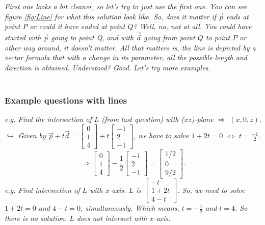 \documentclass[addpoints]{exam}
\begin{document}
\textit{First one looks a bit cleaner, so let's try to just use the first one. You can see figure \ref{fig:Line} for what this solution look like. So, does it matter if $\vec{p}$ ends at point $P$ or could it have ended at point $Q$? Well, no, not at all. You could have started with $\vec{p}$ going to point Q, and with $\vec{d}$ going from point $Q$ to point $P$ or other way around, it doesn't matter. All that matters is, the line is depicted by a vector formula that with a change in its parameter, all the possible length and direction is obtained. Understood? Good. Let's try more examples.
}\\\\
\subsubsection{Example questions with lines}
\textit{
e.g. Find the intersection of $L$ (from last question) with ($xz$)-plane $\Rightarrow$ $(x,0,z).$\\
$\hookrightarrow$ Given by $\vec{p}+t\vec{d}=\begin{bmatrix}
    0\\1\\4
\end{bmatrix}+t\begin{bmatrix}
    -1\\2\\-1
\end{bmatrix}$, we have to solve $1+2t=0$ $\Leftrightarrow$ $t=\frac{-1}{2}.$
}
\[\Rightarrow \begin{bmatrix}
    0\\1\\4
\end{bmatrix}-\frac{1}{2}\begin{bmatrix}
    -1\\2\\-1
\end{bmatrix}=\begin{bmatrix}
    1/2\\0\\9/2
\end{bmatrix}.\]
\textit{
e.g. Find intersection of $L$ with $x$-axis.
$L$ is $\begin{bmatrix}
    -t\\1+2t\\4-t
\end{bmatrix}$. So, we need to solve $1+2t=0$ and $4-t=0$, simultaneously. Which means, $t=-\frac12$ and $t=4$. So there is no solution. $L$ does not intersect with $x$-axis.
}
\end{document}
